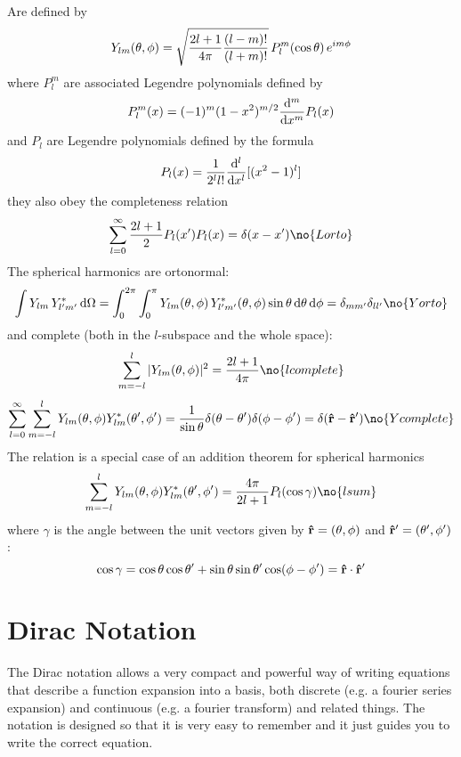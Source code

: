 Are defined by
$$Y_{lm}(\theta,\phi)=\sqrt{{2l+1\over4\pi}{(l-m)!\over(l+m)!}}\,P_l^m(\cos\theta)\,e^{im\phi}$$
where $P_l^m$ are associated Legendre polynomials defined by
$$P_l^m(x)=(-1)^m (1-x^2)^{m/2}{{\rm d}^m\over{\rm d} x^m} P_l(x)$$
and $P_l$ are Legendre polynomials defined by the formula
$$P_l(x)={1\over2^l l!}{{\rm d}^l\over{\rm d} x^l}[(x^2-1)^l]$$
they also obey the completeness relation
$$\sum_{l=0}^\infty {2l+1\over2}P_l(x')P_l(x)=\delta(x-x')\no{Lorto}$$
The spherical harmonics are ortonormal:
$$\int Y_{lm}\,Y^*_{l'm'}\,\d\Omega = 
\int_0^{2\pi}\int_0^{\pi}
Y_{lm}(\theta,\phi)\,Y^*_{l'm'}(\theta,\phi)\sin\theta\,\d\theta\,\d\phi = 
\delta_{mm'}\delta_{ll'}\no{Yorto}$$
and complete (both in the $l$-subspace and the whole space):
$$\sum_{m=-l}^l|Y_{lm}(\theta,\phi)|^2={2l+1\over4\pi}\no{lcomplete}$$
$$\sum_{l=0}^\infty\sum_{m=-l}^lY_{lm}(\theta,\phi)Y_{lm}^*(\theta',\phi')
={1\over\sin\theta}\delta(\theta-\theta')\delta(\phi-\phi')=
\delta({\bf\hat r}-{\bf\hat r'})\no{Ycomplete}$$
The relation  is a special case of an addition theorem for
spherical harmonics
$$\sum_{m=-l}^lY_{lm}(\theta,\phi)Y_{lm}^*(\theta',\phi')=
{4\pi\over 2l+1}P_l(\cos\gamma) \no{lsum}
$$
where $\gamma$ is the angle between the unit vectors given by ${\bf\hat
r}=(\theta,\phi)$
and ${\bf\hat r'}=(\theta',\phi')$:
$$\cos\gamma=\cos\theta\cos\theta'+\sin\theta\sin\theta'\cos(\phi-\phi')
={\bf\hat r}\cdot{\bf\hat r'}$$

\section{Dirac Notation}

The Dirac notation allows a very compact and powerful way of writing equations
that describe a function expansion into a basis, both discrete (e.g. a fourier
series expansion) and continuous (e.g. a fourier transform) and related
things. The notation is designed so that it is very easy to remember and it
just guides you to write the correct equation.

